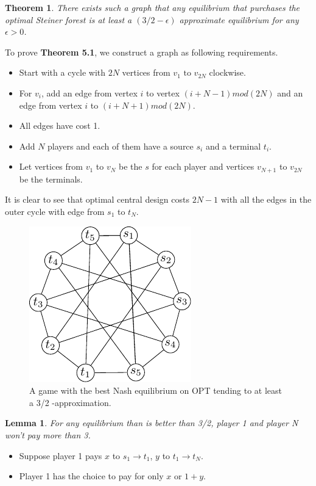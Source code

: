 \documentclass[11pt,psfig,times]{article}
\newtheorem{theorem}{Theorem}[section]
\newtheorem{lemma}{Lemma}[section]
\begin{document}
	\begin{theorem}
		There exists such a graph that any equilibrium that purchases the optimal Steiner forest is at least a $(3/2-\epsilon)$ approximate equilibrium for any $\epsilon > 0$.
	\end{theorem}
	
	To prove \textbf{Theorem 5.1}, we construct a graph as following requirements. 
	
	\begin{itemize}
		\item Start with a cycle with $2N$ vertices from $v_1 \text{ to } v_{2N}$ clockwise. 
		\item For $v_i$, add an edge from vertex $i$ to vertex $(i+N-1)mod (2N)$ and an edge from vertex $i$ to $(i+N+1)mod (2N)$.
		\item All edges have cost 1. 
		\item Add $N$ players and each of them have a source $s_i$ and a terminal $t_i$. 
		\item Let vertices from $v_1$ to $v_N$ be the $s$ for each player and vertices $v_{N+1}$ to $v_{2N}$ be the terminals.
	\end{itemize}
	It is clear to see that optimal central design costs $2N-1$ with all the edges in the outer cycle with edge from $s_1$ to $t_N$. 
		   
	\begin{figure}
		\begin{center}
			\includegraphics{pictures/generalcase.pdf}
		\end{center}
		\caption{ A game with the best Nash equilibrium on OPT tending to at least a 3/2 -approximation.}
	\end{figure}

		\begin{lemma}
			For any equilibrium than is better than 3/2, player 1 and player N won't pay more than 3. 
		\end{lemma}
		\begin{itemize}
			\item Suppose player 1 pays $x$ to $s_1 \rightarrow t_1$, $y$ to $t_1 \rightarrow t_N$. 
			\item Player 1 has the choice to pay for only $x$ or $1+y$. 
		\end{itemize}
		
\end{document}
